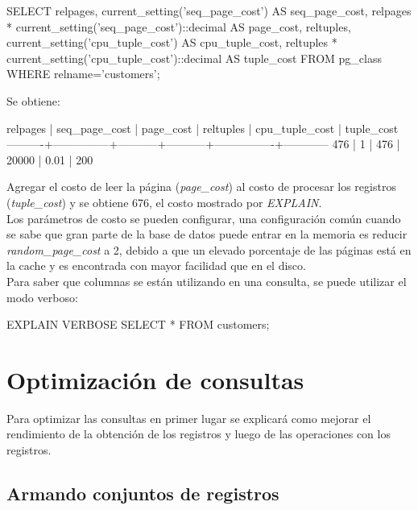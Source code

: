 \begin{pyglist} 
SELECT
relpages,
current_setting('seq_page_cost') AS seq_page_cost,
relpages *
current_setting('seq_page_cost')::decimal AS page_cost,
reltuples,
current_setting('cpu_tuple_cost') AS cpu_tuple_cost,
reltuples *
current_setting('cpu_tuple_cost')::decimal AS tuple_cost
FROM pg_class WHERE relname='customers';
\end{pyglist}

Se obtiene:\\

\begin{pyglist} 
relpages | seq_page_cost | page_cost | reltuples | cpu_tuple_cost | tuple_cost  
----------+---------------+-----------+-----------+----------------+------------ 
      476 | 1             |       476 |     20000 | 0.01           |        200 
\end{pyglist}

Agregar el costo de leer la página (\textit{page\_cost}) al costo de procesar los registros (\textit{tuple\_cost}) y se obtiene 676, el costo mostrado por \textit{EXPLAIN}.\\

Los parámetros de costo se pueden configurar, una configuración común cuando se sabe que gran parte de la base de datos puede entrar en la memoria es reducir \textit{random\_page\_cost} a 2, debido a que un elevado porcentaje de las páginas está en la cache y es encontrada con mayor facilidad que en el disco.\\

Para saber que columnas se están utilizando en una consulta, se puede utilizar el modo verboso:\\

\begin{pyglist}
EXPLAIN VERBOSE SELECT * FROM customers;
\end{pyglist}

\section{Optimización de consultas}

Para optimizar las consultas en primer lugar se explicará como mejorar el rendimiento de la obtención de los registros y luego de las operaciones con los registros.

\subsection{Armando conjuntos de registros}

